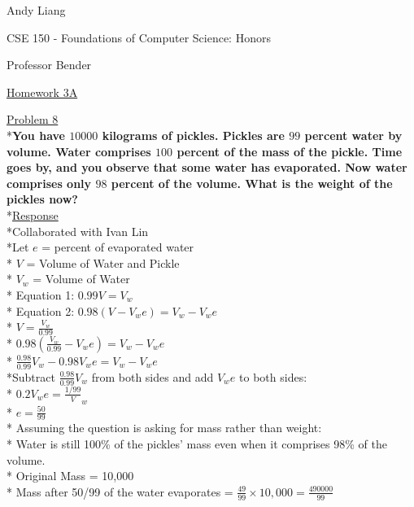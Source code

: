 \documentclass[12pt]{article}
\begin{document}
\begin{flushleft}
Andy Liang

CSE 150 - Foundations of Computer Science: Honors

Professor Bender
\end{flushleft}
\medskip
\centerline{\uline{Homework 3A}}
\bigskip\bigskip

\noindent
\uline{Problem 8}
\\*\textbf{You have $10000$ kilograms of pickles. Pickles are $99$ percent water by volume. Water comprises $100$ percent of the mass of the pickle. Time goes by, and you observe that some water has evaporated. Now water comprises only $98$ percent of the volume. What is the weight of the pickles now?}
\smallskip
\\*\uline{Response}
\\*Collaborated with Ivan Lin
\\*Let $e$ = percent of evaporated water
\\* $V$ = Volume of Water and Pickle
\\* $V_w$ = Volume of Water
\bigskip
\\* Equation 1: $0.99V = V_w$
\\* Equation 2: $0.98(V - V_w e) = V_w - V_w e$
\medskip
\\* $V = \frac{V_w}{0.99}$
\\* $0.98(\frac{V_w}{0.99} - V_w e) = V_w - V_w e$
\\* $\frac{0.98}{0.99}V_w - 0.98V_w e= V_w - V_w e$
\medskip
\\*Subtract $\frac{0.98}{0.99}V_w$ from both sides and add $V_w e$ to both sides:
\\* $0.2V_w e = \frac{1/99}V_w$
\\* $e = \frac{50}{99}$
\bigskip
\\* Assuming the question is asking for mass rather than weight:
\\* Water is still 100\% of the pickles' mass even when it comprises 98\% of the volume.
\\* Original Mass = 10,000
\\* Mass after 50/99 of the water evaporates = $\frac{49}{99} \times 10,000 = \frac{490000}{99}$
\bigskip
\end{document}
